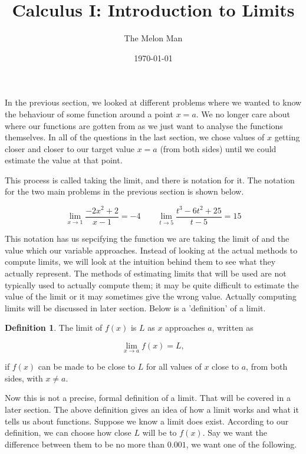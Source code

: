 \documentclass[12pt]{article}
\title{Calculus I: Introduction to Limits}
\author{The Melon Man}
\date{\today}
\theoremstyle{definition}
\newtheorem{definition}{Definition}
\begin{document}
\maketitle

In the previous section, we looked at different problems where we wanted to know the behaviour of some function around a point $x=a$.
We no longer care about where our functions are gotten from as we just want to analyse the functions themselves.
In all of the questions in the last section, we chose values of $x$ getting closer and closer to our target value $x=a$ (from both sides) until we could estimate the value at that point.

This process is called taking the limit, and there is notation for it.
The notation for the two main problems in the previous section is shown below.

\begin{equation*}
    \lim_{x\to1} \frac{-2x^2+2}{x-1} = -4 \qquad \lim_{t\to5} \frac{t^3-6t^2+25}{t-5} = 15
\end{equation*}

This notation has us sepcifying the function we are taking the limit of and the value which our variable approaches.
Instead of looking at the actual methods to compute limits, we will look at the intuition behind them to see what they actually represent.
The methods of estimating limits that will be used are not typically used to actually compute them; it may be quite difficult to estimate the value of the limit or it may sometimes give the wrong value.
Actually computing limits will be discussed in later section.
Below is a 'definition' of a limit.

\begin{definition}
    The limit of $f(x)$ is $L$ as $x$ approaches $a$, written as

    \begin{equation*}
        \lim_{x\to a} f(x) = L, \label{eq:1}
    \end{equation*}

    if $f(x)$ can be made to be close to $L$ for all values of $x$ close to $a$, from both sides, with $x\neq a$.
\end{definition}

Now this is not a precise, formal definition of a limit.
That will be covered in a later section.
The above definition gives an idea of how a limit works and what it tells us about functions.
Suppose we know a limit does exist.
According to our definition, we can choose how close $L$ will be to $f(x)$.
Say we want the difference between them to be no more than $0.001$, we want one of the following.
\end{document}
